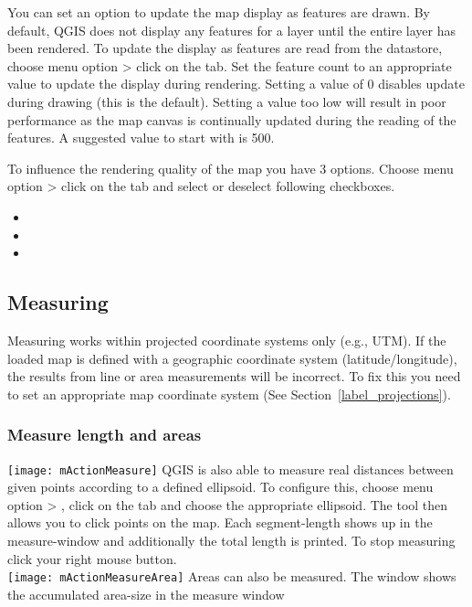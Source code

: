 \label{label_updatemap}

You can set an option to update the map display as features are drawn. By
default, QGIS does not display any features for a layer until the entire
layer has been rendered. To update the display as features are read from the
datastore, choose menu option  > 
click on the  tab. Set the feature count to an
appropriate value to update the display during rendering. Setting a value of 0
disables update during drawing (this is the default). Setting a value too low
will result in poor performance as the map canvas is continually updated
during the reading of the features. A suggested value to start with is 500. 

\label{label_renderquality}

To influence the rendering quality of the map you have 3 options. Choose menu 
option  >  click on the 
 tab and select or deselect following checkboxes.

\begin{itemize}
\item {}
\item {}
\item {}
\end{itemize}


\subsection{Measuring}\label{sec:measure}

Measuring works within projected coordinate systems only (e.g., UTM). If 
the loaded map is defined with a geographic coordinate system
(latitude/longitude), the results from line or area measurements will be 
incorrect. To fix this you need to set an appropriate map coordinate system 
(See Section~\ref{label_projections}).

\subsubsection{Measure length and areas}
\texttt{[image: mActionMeasure]} 
QGIS is also able to measure real distances between given 
points according to a defined ellipsoid. To configure this, choose menu option 
 > , 
click on the  tab and choose the appropriate ellipsoid. The tool then allows you to 
click points on the map. Each segment-length shows up in the measure-window and additionally the total 
length is printed. To stop measuring click your right mouse button. \\
\texttt{[image: mActionMeasureArea]} Areas can also be measured. 
The window shows the accumulated area-size in the measure window 

